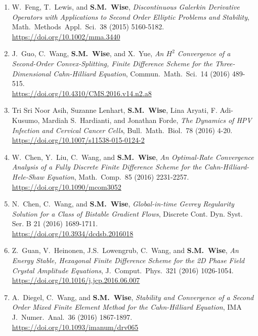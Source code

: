 \documentclass[11pt]{letter}
\begin{document}
\begin{enumerate}
	\item    
W.~Feng, T.~Lewis, and \textbf{S.M.~Wise}, {\sl Discontinuous Galerkin Derivative Operators with Applications to Second Order Elliptic Problems and Stability}, Math.~Methods~Appl.~Sci.~38 (2015) 5160-5182.
	\\ 
\url{https://doi.org/10.1002/mma.3440}  

	\item
J.~Guo, C.~Wang, \textbf{S.M.~Wise}, and X.~Yue, {\sl An $H^2$ Convergence of a Second-Order Convex-Splitting, Finite Difference Scheme for the Three-Dimensional Cahn-Hilliard Equation}, Commun.~Math.~Sci.~14 (2016) 489-515.
	\\ 
\url{https://doi.org/10.4310/CMS.2016.v14.n2.a8}

	\item
Tri Sri Noor Asih, Suzanne Lenhart, \textbf{S.M.~Wise}, Lina Aryati, F. Adi-Kusumo, Mardiah S.~Hardianti, and Jonathan Forde, {\sl The Dynamics of HPV Infection and Cervical Cancer Cells}, Bull.~Math.~Biol.~78 (2016) 4-20.
	\\ 
\url{https://doi.org/10.1007/s11538-015-0124-2}

	\item
W.~Chen, Y.~Liu, C.~Wang, and \textbf{S.M.~Wise}, {\sl An Optimal-Rate Convergence Analysis of a Fully Discrete Finite Difference Scheme for the Cahn-Hilliard-Hele-Shaw Equation}, Math.~Comp.~85 (2016) 2231-2257.
	\\ 
\url{https://doi.org/10.1090/mcom3052}

	\item
N.~Chen, C.~Wang, and \textbf{S.M.~Wise}, {\sl Global-in-time Gevrey Regularity Solution for a Class of Bistable Gradient Flows}, Discrete Cont. Dyn. Syst. Ser. B 21 (2016) 1689-1711.
	\\ 
\url{https://doi.org/10.3934/dcdsb.2016018}

	\item
Z.~Guan, V.~Heinonen, J.S.~Lowengrub, C.~Wang, and \textbf{S.M.~Wise}, {\sl An Energy Stable, Hexagonal Finite Difference Scheme for the 2D Phase Field Crystal Amplitude Equations}, J.~Comput.~Phys.~321 (2016) 1026-1054.
	\\ 
\url{https://doi.org/10.1016/j.jcp.2016.06.007}

	\item
A.~Diegel, C.~Wang, and \textbf{S.M.~Wise}, {\sl Stability and Convergence of a Second Order Mixed Finite Element Method for the Cahn-Hilliard Equation}, IMA J.~Numer.~Anal.~36 (2016) 1867-1897.
	\\ 
\url{https://doi.org/10.1093/imanum/drv065}


\end{enumerate}
\end{document}
